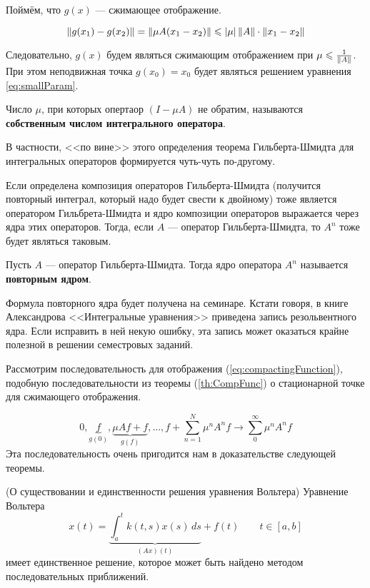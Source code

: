 \documentclass[12pt]{article}
\begin{document}
	Поймём, что $g(x)$ --- сжимающее отображение.
	
	$$\left\| g(x_1) - g(x_2) \right\| = \left\| \mu A(x_1 - x_2) \right\| \leqslant \left| \mu \right| \left\| A \right\| \cdot \left\| x_1 - x_2 \right\|$$
	
	Следовательно, $g(x)$ будем являться сжимающим отображением при $\mu \leqslant \frac{1}{\left\| A \right\|}$. При этом
	неподвижная точка $g(x_0) = x_0$ будет являться решением уравнения \ref{eq:smallParam}.
	
	\begin{defi}
		Число $\mu$, при которых опертаор $(I - \mu A)$ не обратим, называются \textbf{собственным числом
		интегрального оператора}.
	\end{defi}
	
	В частности, <<по вине>> этого определения теорема Гильберта-Шмидта для интегральных операторов формируется
	чуть-чуть по-другому.
	
	Если определена композиция операторов Гильберта-Шмидта (получится повторный интеграл, который надо будет 
	свести к двойному) тоже является оператором Гильбрета-Шмидта и ядро композиции операторов выражается 
	через ядра этих операторов. Тогда, если $A$ --- оператор Гильберта-Шмидта, то $A^n$ тоже будет являться
	таковым.
	
	\begin{defi}
		Пусть $A$ --- оператор Гильберта-Шмидта. Тогда ядро оператора $A^n$ называется \textbf{повторным ядром}.
	\end{defi}
	
	{\footnotesize
	Формула повторного ядра будет получена на семинаре. Кстати говоря, в книге Александрова <<Интегральные уравнения>>
	приведена запись резольвентного ядра. Если исправить в ней некую ошибку, эта запись может оказаться крайне полезной
	в решении семестровых заданий.\par
	}
	
	Рассмотрим последовательность для отображения (\ref{eq:compactingFunction}), подобную последовательности
	из теоремы (\ref{th:CompFunc}) о стационарной точке для сжимающего отображения.
	
	$$0, \underbrace{f}_{g(0)}, \underbrace{\mu Af + f}_{g(f)}, \ldots, f + \sum_{n=1}^N \mu^nA^nf \rightarrow \sum_0^{\infty} \mu^nA^n f$$
	Эта последовательность очень пригодится нам в доказательстве следующей теоремы.	
	
	\begin{theorem}
		(О существовании и единственности решения уравнения Вольтера)
		Уравнение Вольтера
		$$x(t) = \underbrace{\int_a^t k(t,s) x(s) \, ds}_{(Ax)(t)} + f(t) \qquad t\in [a,b]$$
		имеет единственное решение, которое может быть найдено методом последовательных приближений.
	\end{theorem}		
	
\end{document}
